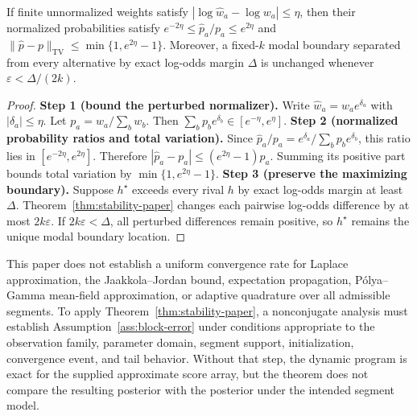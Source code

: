 \begin{corollary}
\label{cor:stability-paper}
If finite unnormalized weights satisfy $|\log\widehat w_a-\log w_a|\le\eta$, then their normalized probabilities satisfy $e^{-2\eta}\le\widehat p_a/p_a\le e^{2\eta}$ and $\|\widehat p-p\|_{\mathrm{TV}}\le\min\{1,e^{2\eta}-1\}$. Moreover, a fixed-$k$ modal boundary separated from every alternative by exact log-odds margin $\Delta$ is unchanged whenever $\varepsilon<\Delta/(2k)$.
\end{corollary}
\begin{proof}
\textbf{Step 1 (bound the perturbed normalizer).}
Write $\widehat w_a=w_ae^{\delta_a}$ with $|\delta_a|\le\eta$. Let $p_a=w_a/\sum_bw_b$. Then $\sum_bp_be^{\delta_b}\in[e^{-\eta},e^\eta]$.
\textbf{Step 2 (normalized probability ratios and total variation).}
Since $\widehat p_a/p_a=e^{\delta_a}/\sum_bp_be^{\delta_b}$, this ratio lies in $[e^{-2\eta},e^{2\eta}]$. Therefore $|\widehat p_a-p_a|\le(e^{2\eta}-1)p_a$. Summing its positive part bounds total variation by $\min\{1,e^{2\eta}-1\}$.
\textbf{Step 3 (preserve the maximizing boundary).}
Suppose $h^\star$ exceeds every rival $h$ by exact log-odds margin at least $\Delta$. Theorem~\ref{thm:stability-paper} changes each pairwise log-odds difference by at most $2k\varepsilon$. If $2k\varepsilon<\Delta$, all perturbed differences remain positive, so $h^\star$ remains the unique modal boundary location.
\end{proof}

\begin{proofobligation}
\label{obl:routine-certification-paper}
This paper does not establish a uniform convergence rate for Laplace approximation, the Jaakkola--Jordan bound, expectation propagation, P\'olya--Gamma mean-field approximation, or adaptive quadrature over all admissible segments. To apply Theorem~\ref{thm:stability-paper}, a nonconjugate analysis must establish Assumption~\ref{ass:block-error} under conditions appropriate to the observation family, parameter domain, segment support, initialization, convergence event, and tail behavior. Without that step, the dynamic program is exact for the supplied approximate score array, but the theorem does not compare the resulting posterior with the posterior under the intended segment model.
\end{proofobligation}



